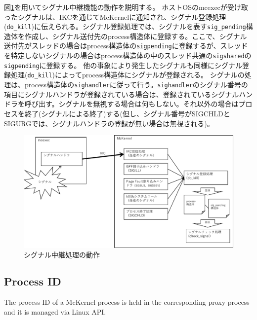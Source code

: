 \documentclass[twoside,11pt,fleqn]{book}
\begin{document}
図\ref{fig:signal_relay_flow}を用いてシグナル中継機能の動作を説明する。
ホストOSのmcexecが受け取ったシグナルは、IKCを通じてMcKernelに通知され、シグナル登録処理(\texttt{do\_kill})に伝えられる。シグナル登録処理では、シグナルを表す\texttt{sig\_pending}構造体を作成し、シグナル送付先のprocess構造体に登録する。ここで、シグナル送付先がスレッドの場合はprocess構造体の\texttt{sigpending}に登録するが、スレッドを特定しないシグナルの場合はprocess構造体の中のスレッド共通の\texttt{sigshared}の\texttt{sigpending}に登録する。
他の事象により発生したシグナルも同様にシグナル登録処理(\texttt{do\_kill})によってprocess構造体にシグナルが登録される。
シグナルの処理は、process構造体の\texttt{sighandler}に従って行う。\texttt{sighandler}のシグナル番号の項目にシグナルハンドラが登録されている場合は、登録されているシグナルハンドラを呼び出す。シグナルを無視する場合は何もしない。それ以外の場合はプロセスを終了(シグナルによる終了)する(但し、シグナル番号がSIGCHLDとSIGURGでは、シグナルハンドラの登録が無い場合は無視される)。
\begin{figure}[h!]
\centering
\includegraphics[width=13cm]{figs/signal_relay_flow.pdf}
\vspace{-0em}\caption{シグナル中継処理の動作}
\label{fig:signal_relay_flow}
\vspace{-0em}
\end{figure}
\FloatBarrier


\subsection{Process ID}
The process ID of a McKernel process is held in the corresponding proxy process and it is managed via Linux API.
\end{document}
